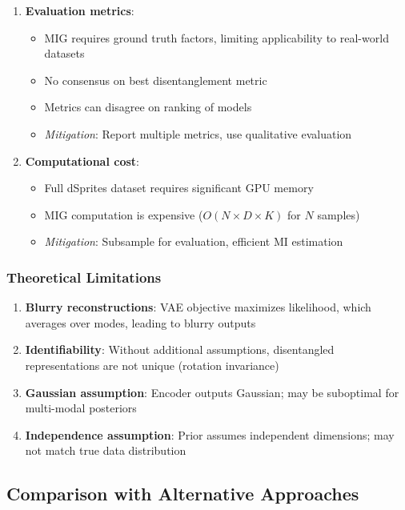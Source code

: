 \documentclass[conference]{IEEEtran}
\begin{document}
\begin{enumerate}
    \item \textbf{Evaluation metrics}: 
    \begin{itemize}
        \item MIG requires ground truth factors, limiting applicability to real-world datasets
        \item No consensus on best disentanglement metric
        \item Metrics can disagree on ranking of models
        \item \textit{Mitigation}: Report multiple metrics, use qualitative evaluation
    \end{itemize}
    
    \item \textbf{Computational cost}:
    \begin{itemize}
        \item Full dSprites dataset requires significant GPU memory
        \item MIG computation is expensive ($O(N \times D \times K)$ for $N$ samples)
        \item \textit{Mitigation}: Subsample for evaluation, efficient MI estimation
    \end{itemize}
\end{enumerate}

\subsubsection{Theoretical Limitations}

\begin{enumerate}
    \item \textbf{Blurry reconstructions}: VAE objective maximizes likelihood, which averages over modes, leading to blurry outputs
    
    \item \textbf{Identifiability}: Without additional assumptions, disentangled representations are not unique (rotation invariance)
    
    \item \textbf{Gaussian assumption}: Encoder outputs Gaussian; may be suboptimal for multi-modal posteriors
    
    \item \textbf{Independence assumption}: Prior assumes independent dimensions; may not match true data distribution
\end{enumerate}

\subsection{Comparison with Alternative Approaches}
\end{document}
